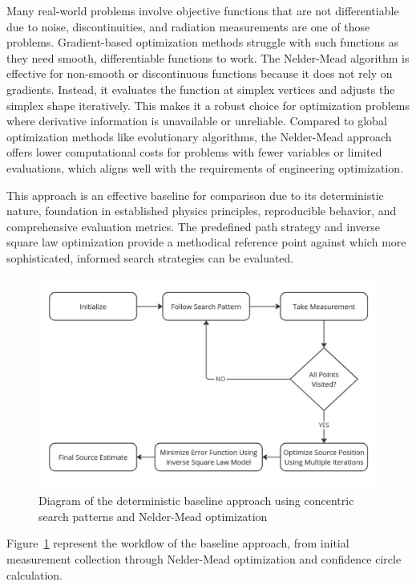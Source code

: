 \documentclass[../report.tex]{subfiles}
\begin{document}
        
    Many real-world problems involve objective functions that are not differentiable due to noise, discontinuities, and radiation measurements are one of those 
    problems. Gradient-based optimization methods struggle with such functions as they need smooth, differentiable functions to work. The Nelder-Mead algorithm is 
    effective for non-smooth or discontinuous functions because it does not rely on gradients. Instead, it evaluates the function at simplex vertices and adjusts the 
    simplex shape iteratively. This makes it a robust choice for optimization problems where derivative information is unavailable or unreliable. Compared to global optimization methods 
    like evolutionary algorithms, the Nelder-Mead approach offers lower computational costs for problems with fewer variables or limited evaluations, which aligns 
    well with the requirements of engineering optimization. \cite{luersen2004constrained}


    This approach is an effective baseline for comparison due to its deterministic nature, foundation in established physics principles, reproducible 
    behavior, and comprehensive evaluation metrics. The predefined path strategy and inverse square law optimization provide a methodical reference
    point against which more sophisticated, informed search strategies can be evaluated.
    \begin{figure}[ht]
        \centering
        \includegraphics[width=\linewidth]{figures/inv_sq_flow.pdf}
        \caption{Diagram of the deterministic baseline approach using concentric search patterns and Nelder-Mead optimization}
        \label{fig:inverse_square_method_flow}
    \end{figure}

    Figure~\ref{fig:inverse_square_method_flow} represent the workflow of the baseline approach, from initial measurement collection through Nelder-Mead optimization 
    and confidence circle calculation.
\end{document}
